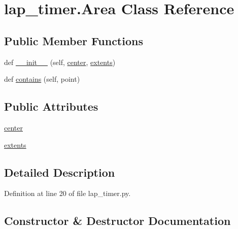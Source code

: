 \hypertarget{classlap__timer_1_1_area}{}\section{lap\+\_\+timer.\+Area Class Reference}
\label{classlap__timer_1_1_area}
\subsection*{Public Member Functions}
\begin{DoxyCompactItemize}
\item 
def \hyperlink{classlap__timer_1_1_area_a37122256dc032bc0b2d7e54ac1ad9530}{\+\_\+\+\_\+init\+\_\+\+\_\+} (self, \hyperlink{classlap__timer_1_1_area_ae04bf9abe3859ab806dc3f3a699d9689}{center}, \hyperlink{classlap__timer_1_1_area_a9c808f67a0835a36528d4b7abd4f2950}{extents})
\item 
def \hyperlink{classlap__timer_1_1_area_a782a85c5bdf1baf1592a9e075e37edb9}{contains} (self, point)
\end{DoxyCompactItemize}
\subsection*{Public Attributes}
\begin{DoxyCompactItemize}
\item 
\hyperlink{classlap__timer_1_1_area_ae04bf9abe3859ab806dc3f3a699d9689}{center}
\item 
\hyperlink{classlap__timer_1_1_area_a9c808f67a0835a36528d4b7abd4f2950}{extents}
\end{DoxyCompactItemize}


\subsection{Detailed Description}


Definition at line 20 of file lap\+\_\+timer.\+py.



\subsection{Constructor \& Destructor Documentation}
